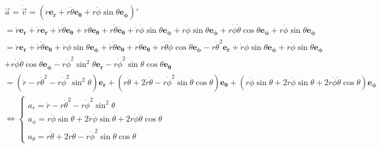 \documentclass[a4paper,10pt,twoside]{article}
\begin{document}
\begin{gather*}
    \vec a = \dot {\vec v} = (\dot r \mathbf{ e_r}+r\dot\theta\mathbf{ e_\theta}+r\dot \phi \sin{\theta}\mathbf{ e_\phi})'\\=  \ddot r \mathbf{ e_r}+\dot r \mathbf{\dot{e}_r}+\dot r\dot\theta\mathbf{ e_\theta}+ r\ddot\theta\mathbf{ e_\theta}+r\dot\theta\mathbf{ \dot{e}_\theta}+\dot r\dot \phi \sin{\theta}\mathbf{ e_\phi}+r\ddot \phi \sin{\theta}\mathbf{ e_\phi}+r\dot \phi\dot\theta \cos{\theta}\mathbf{ e_\phi}+r\dot \phi \sin{\theta}\mathbf{ \dot{e}_\phi}\\
    =  \ddot r \mathbf{ e_r}+\dot r\dot\theta\mathbf{ e_\theta}+\dot r\dot\phi\sin{\theta}\mathbf{ e_\phi} + \dot r\dot\theta\mathbf{ e_\theta}+ r\ddot\theta\mathbf{ e_\theta}+r\dot\theta
   \dot\phi\cos{\theta}\mathbf{ e_\phi}-r\dot{\theta}^2\mathbf{ e_r}+\dot r\dot \phi\sin{\theta}\mathbf{ e_\phi}+r\ddot \phi \sin{\theta}\mathbf{ e_\phi}\\+r\dot \phi\dot\theta \cos{\theta}\mathbf{ e_\phi}-r\dot \phi^2\sin^2{\theta}\mathbf{ e_r} -r\dot \phi^2 \sin{\theta}\cos{\theta}\mathbf{e_\theta}\\
   =   (\ddot r-r\dot{\theta}^2-r\dot \phi^2\sin^2{\theta}) \mathbf{ e_r}+(r\ddot\theta+2\dot r\dot\theta-r\dot \phi^2 \sin{\theta}\cos{\theta})\mathbf{ e_\theta}+(r\ddot \phi \sin{\theta}+2\dot r\dot \phi \sin{\theta}+2r\dot \phi\dot\theta \cos{\theta})\mathbf{ e_\phi}\\
    \iff \begin{cases}
         a_r = \ddot r-r\dot{\theta}^2-r\dot \phi^2\sin^2{\theta} \\
         a_\phi = r\ddot \phi \sin{\theta}+2\dot r\dot \phi \sin{\theta}+2r\dot \phi\dot\theta \cos{\theta} \\
         a_\theta = r\ddot\theta+2\dot r\dot\theta-r\dot \phi^2 \sin{\theta}\cos{\theta}
    \end{cases}       
\end{gather*}
\end{document}
